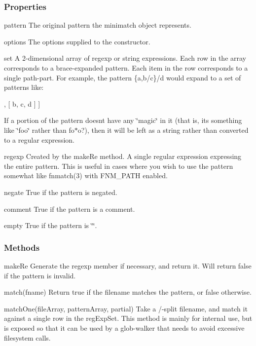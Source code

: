 \subsubsection*{Properties}


\begin{DoxyItemize}
\item {\ttfamily pattern} The original pattern the minimatch object represents.
\item {\ttfamily options} The options supplied to the constructor.
\item {\ttfamily set} A 2-\/dimensional array of regexp or string expressions. Each row in the array corresponds to a brace-\/expanded pattern. Each item in the row corresponds to a single path-\/part. For example, the pattern {\ttfamily \{a,b/c\}/d} would expand to a set of patterns like\+: \begin{DoxyVerb}  [ [ a, d ]
  , [ b, c, d ] ]
\end{DoxyVerb}


If a portion of the pattern doesn\textquotesingle{}t have any \char`\"{}magic\char`\"{} in it (that is, it\textquotesingle{}s something like {\ttfamily \char`\"{}foo\char`\"{}} rather than {\ttfamily fo$\ast$o?}), then it will be left as a string rather than converted to a regular expression.
\item {\ttfamily regexp} Created by the {\ttfamily make\+Re} method. A single regular expression expressing the entire pattern. This is useful in cases where you wish to use the pattern somewhat like {\ttfamily fnmatch(3)} with {\ttfamily F\+N\+M\+\_\+\+P\+A\+T\+H} enabled.
\item {\ttfamily negate} True if the pattern is negated.
\item {\ttfamily comment} True if the pattern is a comment.
\item {\ttfamily empty} True if the pattern is {\ttfamily \char`\"{}\char`\"{}}.
\end{DoxyItemize}

\subsubsection*{Methods}


\begin{DoxyItemize}
\item {\ttfamily make\+Re} Generate the {\ttfamily regexp} member if necessary, and return it. Will return {\ttfamily false} if the pattern is invalid.
\item {\ttfamily match(fname)} Return true if the filename matches the pattern, or false otherwise.
\item {\ttfamily match\+One(file\+Array, pattern\+Array, partial)} Take a {\ttfamily /}-\/split filename, and match it against a single row in the {\ttfamily reg\+Exp\+Set}. This method is mainly for internal use, but is exposed so that it can be used by a glob-\/walker that needs to avoid excessive filesystem calls.
\end{DoxyItemize}

